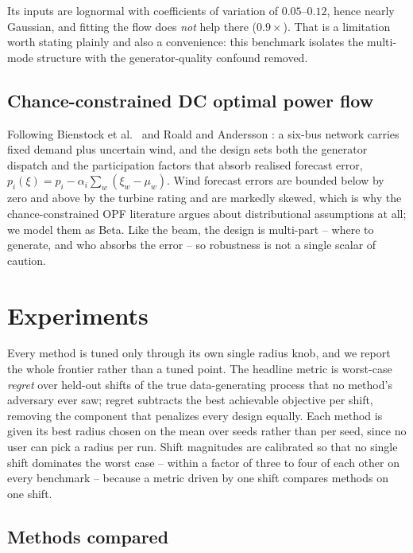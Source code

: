 \documentclass[11pt]{article}
\begin{document}
Its inputs are lognormal with coefficients of variation of $0.05$--$0.12$, hence nearly
Gaussian, and fitting the flow does \emph{not} help there ($0.9\times$). That is a
limitation worth stating plainly and also a convenience: this benchmark isolates the
multi-mode structure with the generator-quality confound removed.

\subsection{Chance-constrained DC optimal power flow}
\label{p:opf}
Following Bienstock et al.\ \citep{bienstock2014} and Roald and Andersson \citep{roald2015}: a six-bus network carries fixed
demand plus uncertain wind, and the design sets both the generator dispatch and the
participation factors that absorb realised forecast error,
$p_i(\xi) = p_i - \alpha_i \sum_w (\xi_w - \mu_w)$. Wind forecast errors are bounded below
by zero and above by the turbine rating and are markedly skewed, which is why the
chance-constrained OPF literature argues about distributional assumptions at all; we model
them as Beta. Like the beam, the design is multi-part -- where to generate, and who absorbs
the error -- so robustness is not a single scalar of caution.

\section{Experiments}
\label{sec:experiments}
Every method is tuned only through its own single radius knob, and we report the whole
frontier rather than a tuned point. The headline metric is worst-case \emph{regret} over
held-out shifts of the true data-generating process that no method's adversary ever saw;
regret subtracts the best achievable objective per shift, removing the component that
penalizes every design equally. Each method is given its best radius chosen on the mean
over seeds rather than per seed, since no user can pick a radius per run. Shift magnitudes
are calibrated so that no single shift dominates the worst case -- within a factor of three
to four of each other on every benchmark -- because a metric driven by one shift compares
methods on one shift.

\subsection{Methods compared}
\label{sec:methods-compared}
\end{document}
